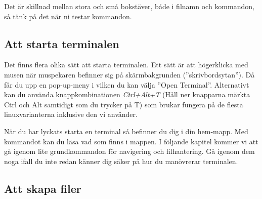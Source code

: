 \documentclass[a4paper,twocolumn]{book}
\begin{document}
Det är skillnad mellan stora och små bokstäver, både i filnamn och kommandon, så
tänk på det när ni testar kommandon.

\subsection{Att starta terminalen}
Det finns flera olika sätt att starta terminalen. Ett sätt är att högerklicka med musen när muspekaren befinner sig på skärmbakgrunden (''skrivbordsytan''). Då får du upp en pop-up-meny i vilken du kan välja ''Open Terminal''.
Alternativt kan du använda knappkombinationen \emph{Ctrl+Alt+T} (Håll ner knapparna märkta Ctrl och Alt samtidigt som du trycker på T) som brukar fungera på de flesta linuxvarianterna inklusive den vi använder.

När du har lyckats starta en terminal så befinner du dig i din hem-mapp. Med kommandot   kan du läsa vad som finns i mappen.
I följande kapitel kommer vi att gå igenom lite grundkommandon för navigering och filhantering. Gå igenom dem noga ifall du inte redan
känner dig säker på hur du manövrerar terminalen.

\subsection{Att skapa filer}
\end{document}
